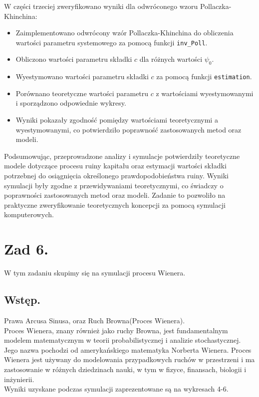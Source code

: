 \documentclass[12pt,letterpaper]{article}
\theoremstyle{definition}
\begin{document}
W części trzeciej zweryfikowano wyniki dla odwróconego wzoru Pollaczka-Khinchina:
\begin{itemize}
    \item Zaimplementowano odwrócony wzór Pollaczka-Khinchina do obliczenia wartości parametru systemowego za pomocą funkcji \texttt{inv\_Poll}.
    \item Obliczono wartości parametru składki \( c \) dla różnych wartości \(\psi_0\).
    \item Wyestymowano wartości parametru składki \( c \) za pomocą funkcji \texttt{estimation}.
    \item Porównano teoretyczne wartości parametru \( c \) z wartościami wyestymowanymi i sporządzono odpowiednie wykresy.
    \item Wyniki pokazały zgodność pomiędzy wartościami teoretycznymi a wyestymowanymi, co potwierdziło poprawność zastosowanych metod oraz modeli.
\end{itemize}

Podsumowując, przeprowadzone analizy i symulacje potwierdziły teoretyczne modele dotyczące procesu ruiny kapitału oraz estymacji wartości składki potrzebnej do osiągnięcia określonego prawdopodobieństwa ruiny. Wyniki symulacji były zgodne z przewidywaniami teoretycznymi, co świadczy o poprawności zastosowanych metod oraz modeli. Zadanie to pozwoliło na praktyczne zweryfikowanie teoretycznych koncepcji za pomocą symulacji komputerowych.

\section{Zad 6.}
W tym zadaniu skupimy się na symulacji procesu Wienera.

\subsection{Wstęp.}
Prawa Arcusa Sinusa, oraz Ruch Browna(Proces Wienera). \\

Proces Wienera, znany również jako ruchy Browna, jest fundamentalnym modelem matematycznym w teorii probabilistycznej i analizie stochastycznej. Jego nazwa pochodzi od amerykańskiego matematyka Norberta Wienera. Proces Wienera jest używany do modelowania przypadkowych ruchów w przestrzeni i ma zastosowanie w różnych dziedzinach nauki, w tym w fizyce, finansach, biologii i inżynierii.\\

Wyniki uzyskane podczas symulacji zaprezentowane są na wykresach 4-6.
\end{document}

